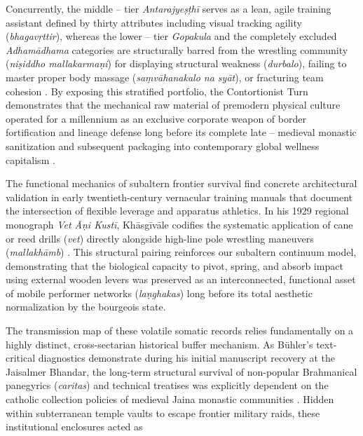 \documentclass[11pt,twoside,letterpaper]{article}
\begin{document}
Concurrently, the middle -- tier \textit{Antarajye\d{s}\d{t}h\={i}} serves as a lean, agile training assistant defined by thirty attributes including visual tracking agility (\textit{bhagav\d{r}ttir}), whereas the lower -- tier \textit{Gopakula} and the completely excluded \textit{Adham\={a}dhama} categories are structurally barred from the wrestling community (\textit{ni\d{s}iddho mallakarma\d{n}i}) for displaying structural weakness (\textit{durbalo}), failing to master proper body massage (\textit{sa\d{m}v\={a}hanakalo na sy\={a}t}), or fracturing team cohesion \citep{Sandesara1964}. By exposing this stratified portfolio, the Contortionist Turn demonstrates that the mechanical raw material of premodern physical culture operated for a millennium as an exclusive corporate weapon of border fortification and lineage defense long before its complete late -- medieval monastic sanitization and subsequent packaging into contemporary global wellness capitalism \citep{Sandesara1964, Wujastyk2025}.

The functional mechanics of subaltern frontier survival find concrete architectural validation in early twentieth-century vernacular training manuals that document the intersection of flexible leverage and apparatus athletics. In his 1929 regional monograph \textit{Vet \={A}\d{n}i Kust\={i}}, Kh\={a}sg\={i}v\={a}le codifies the systematic application of cane or reed drills (\textit{vet}) directly alongside high-line pole wrestling maneuvers (\textit{mallakh\={a}mb}) \citep{Khasgivale1929}. This structural pairing reinforces our subaltern continuum model, demonstrating that the biological capacity to pivot, spring, and absorb impact using external wooden levers was preserved as an interconnected, functional asset of mobile performer networks (\textit{la\d{n}ghakas}) long before its total aesthetic normalization by the bourgeois state.

The transmission map of these volatile somatic records relies fundamentally on a highly distinct, cross-sectarian historical buffer mechanism. As Bühler’s text-critical diagnostics demonstrate during his initial manuscript recovery at the Jaisalmer Bhandar, the long-term structural survival of non-popular Brahmanical panegyrics (\textit{caritas}) and technical treatises was explicitly dependent on the catholic collection policies of medieval Jaina monastic communities \citep{Buhler1875}. Hidden within subterranean temple vaults to escape frontier military raids, these institutional enclosures acted as
\end{document}
